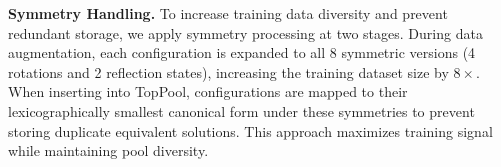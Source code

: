 \documentclass{article}
\theoremstyle{plain}
\theoremstyle{definition}
\theoremstyle{remark}
\begin{document}
\begin{table}[htbp]
\vspace{0.1in}
\begin{center}
\begin{small}
\begin{sc}
\caption{PatternBoost Hyperparameters}
\label{tab:patternboost_hyperparams}
\end{sc}
\end{small}
\end{center}
\vspace{0.1in}
\end{table}


\textbf{Symmetry Handling.} To increase training data diversity and prevent redundant storage, we apply symmetry processing at two stages. During data augmentation, each configuration is expanded to all 8 symmetric versions (4 rotations and 2 reflection states), increasing the training dataset size by $8\times$. When inserting into TopPool, configurations are mapped to their lexicographically smallest canonical form under these symmetries to prevent storing duplicate equivalent solutions. This approach maximizes training signal while maintaining pool diversity.
\end{document}

